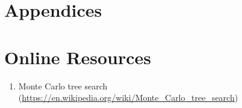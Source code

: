 \documentclass[sigconf]{acmart}
\begin{document}
\section{Appendices}



\appendix

\section{Online Resources}
\begin{enumerate}
  \item Monte Carlo tree search (\url{https://en.wikipedia.org/wiki/Monte_Carlo_tree_search})
  
\end{enumerate}
\end{document}

